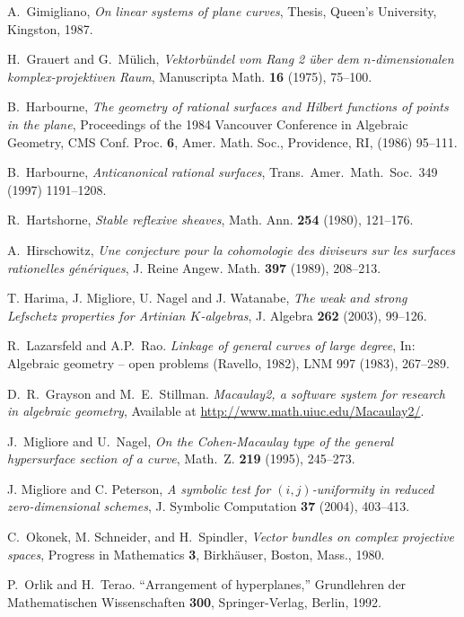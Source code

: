 \documentclass[12pt]{amsart}
\numberwithin{equation}{section}
\theoremstyle{definition}
\begin{document}
\begin{thebibliography}{BNAL}
A.\ Gimigliano,  {\it On linear systems of plane curves}, Thesis, Queen's University, Kingston, 1987.

H.\ Grauert  and G.\ M\"ulich, {\it Vektorb\"undel vom Rang 2 \"uber dem $n$-dimensionalen komplex-projektiven Raum},  Manuscripta Math. {\bf 16} (1975), 75--100.

B.\ Harbourne, 
{\it  The geometry of rational surfaces and Hilbert functions of points in the plane}, Proceedings of
the 1984 Vancouver Conference in Algebraic Geometry, CMS Conf. Proc. {\bf 6},  Amer. Math. Soc., Providence,
RI, (1986) 95--111.

B.\ Harbourne, 
{\it Anticanonical rational surfaces}, 
Trans.\ Amer.\ Math.\ Soc.\ 349 (1997) 1191--1208. 

R.\  Hartshorne, {\it Stable reflexive sheaves},  Math. Ann. {\bf 254} (1980), 121--176.

A.\ Hirschowitz, {\it Une conjecture pour la cohomologie des diviseurs sur les surfaces rationelles g\'en\'eriques}, J.
Reine Angew. Math. {\bf 397} (1989), 208--213.

T. Harima, J. Migliore, U. Nagel and J. Watanabe, {\em The weak and strong Lefschetz properties for Artinian $K$-algebras}, J. Algebra {\bf 262} (2003), 99--126.

R.\ Lazarsfeld and A.P.\ Rao.
{\it Linkage of general curves of large degree}, 
In: Algebraic geometry -- open problems (Ravello, 1982), LNM 997 (1983), 267--289.

D.\ R.\ Grayson and M.\ E.\ Stillman.
{\it Macaulay2, a software system for research in algebraic geometry},
Available at \url{http://www.math.uiuc.edu/Macaulay2/}. 

J.\ Migliore  and U.\ Nagel, {\em On the Cohen-Macaulay type of
    the general hypersurface section of a curve},
  Math.\ Z. {\bf 219} (1995), 245--273.

J. Migliore and C. Peterson,
{\it A symbolic test for $(i,j)$-uniformity in reduced zero-dimensional schemes}, J. Symbolic Computation {\bf 37} (2004), 403--413.

C.\ Okonek, M. Schneider, and H.\  Spindler, {\it Vector bundles on complex projective spaces},  Progress in Mathematics {\bf 3},  Birkh\"auser, Boston, Mass., 1980.

P.\ Orlik and H.\ Terao. 
``Arrangement of hyperplanes,'' Grundlehren
der Mathematischen Wissenschaften {\bf 300}, 
Springer-Verlag, Berlin, 1992.


\end{thebibliography}
\end{document}
